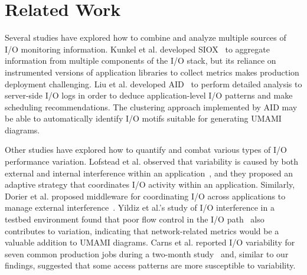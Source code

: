 \section{Related Work} \label{sec:related}

Several studies have explored how to combine and analyze multiple sources of I/O monitoring information.
Kunkel et al. developed SIOX~\cite{Kunkel:2014:SAC:2769884.2769901} to aggregate information from multiple components of the I/O stack, 
but its reliance on instrumented versions of application libraries to collect metrics makes production deployment challenging.
Liu et al. developed AID~\cite{Liu2016} to perform detailed analysis to server-side I/O logs in order to deduce application-level I/O patterns and make scheduling recommendations.  The clustering approach implemented by AID may be able to automatically identify I/O motifs suitable for generating UMAMI diagrams.

Other studies have explored how to quantify and combat various types of I/O performance variation.
Lofstead et al. observed that variability is caused by both external and internal interference within an application~\cite{Lofstead2010}, and they proposed an adaptive strategy that coordinates I/O activity within an application.
Similarly, Dorier et al. proposed middleware for coordinating I/O across applications to manage external interference~\cite{dorier2014calciom}.
Yildiz et al.'s study of I/O interference in a testbed environment found that poor flow control in the I/O path~\cite{Yildiz2016} also contributes to variation, indicating that network-related metrics would be a valuable addition to UMAMI diagrams.
Carns et al. reported I/O variability for seven common production jobs during a two-month study~\cite{carns2011understanding} and, similar to our findings, suggested that some access patterns are more susceptible to variability.
